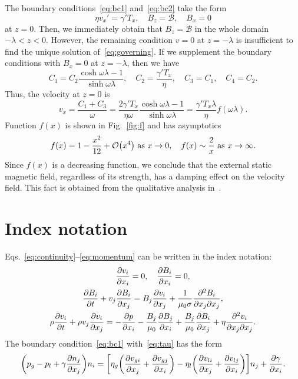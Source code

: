 \documentclass{article}
\begin{document}
The boundary conditions~\eqref{eq:bc1} and~\eqref{eq:bc2} take the form
\begin{equation}\label{eq:bc}
    \eta v_x' = \gamma' T_x, \quad B_z = \mathcal{B}, \quad B_x = 0
\end{equation}
at $z=0$.
Then, we immediately obtain that $B_z=\mathcal{B}$ in the whole domain $-\lambda<z<0$.
However, the remaining condition $v=0$ at $z=-\lambda$ is insufficient to find the unique solution of~\eqref{eq:governing}.
If we supplement the boundary conditions with $B_x = 0$ at $z=-\lambda$, then we have
\begin{equation}\label{eq:constants}
    C_1 = C_2\frac{\cosh\omega\lambda-1}{\sinh\omega\lambda}, \quad
    C_2 = \frac{\gamma'T_x}{\eta}, \quad
    C_3 = C_1, \quad C_4 = C_2.
\end{equation}
Thus, the velocity at $z=0$ is
\begin{equation}\label{eq:velocity}
    v_x = \frac{C_1+C_3}{\omega}
        = \frac{2\gamma'T_x}{\eta\omega}\frac{\cosh\omega\lambda-1}{\sinh\omega\lambda}
        = \frac{\gamma'T_x\lambda}{\eta} f(\omega\lambda).
\end{equation}
Function $f(x)$ is shown in Fig.~\ref{fig:f} and has asymptotics
\begin{equation}\label{eq:f_asym}
    f(x) = 1 - \frac{x^2}{12} + \order{x^4} \text{ as } x\to0, \quad
    f(x) \sim \frac2x \text{ as } x\to\infty.
\end{equation}
Since $f(x)$ is a decreasing function,
we conclude that the external static magnetic field, regardless of its strength, has a damping effect on the velocity field.
This fact is obtained from the qualitative analysis in~\cite{du2019influence}.

\appendix

\section{Index notation}

Eqs.~\eqref{eq:continuity}--\eqref{eq:momentum} can be written in the index notation:
\begin{gather}
    \pdv{v_i}{x_i} = 0, \quad \pdv{B_i}{x_i} = 0, \label{eq:continuityI}\\
    \pdv{B_i}{t} + v_j\pdv{B_i}{x_j} = B_j\pdv{v_i}{x_j} + \frac1{\mu_0\sigma} \pdv[2]{B_i}{x_j}{x_j}, \label{eq:BI}\\
    \rho\pdv{v_i}{t} + \rho v_j\pdv{v_i}{x_j}
    = -\pdv{p}{x_i} - \frac{B_j}{\mu_0}\pdv{B_j}{x_i} + \frac{B_j}{\mu_0}\pdv{B_i}{x_j} + \eta\pdv[2]{v_i}{x_j}{x_j}. \label{eq:momentumI}
\end{gather}
The boundary condition~\eqref{eq:bc1} with~\eqref{eq:tau} has the form
\begin{equation}\label{eq:bc1I}
    \qty(p_g - p_l + \gamma\pdv{n_j}{x_j})n_i
    = \qty[
        \eta_g\qty( \pdv{v_{gi}}{x_j} + \pdv{v_{gj}}{x_i} )
      - \eta_l\qty( \pdv{v_{li}}{x_j} + \pdv{v_{lj}}{x_i} )
    ]n_j + \pdv{\gamma}{x_i}.
\end{equation}

\printbibliography
\end{document}
